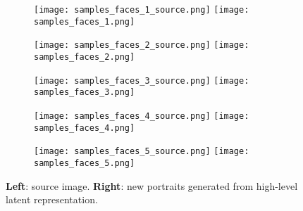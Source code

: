 \documentclass{article}
\begin{document}
\begin{figure*}[p]

\begin{subfigure}{0.98\textwidth}
  \centering
  \texttt{[image: samples\_faces\_1\_source.png]}
  \hspace{14pt}
  \texttt{[image: samples\_faces\_1.png]}

\end{subfigure}

\vspace{3pt}

 \begin{subfigure}{0.98\textwidth}
   \centering
   \texttt{[image: samples\_faces\_2\_source.png]}
  \hspace{14pt}
   \texttt{[image: samples\_faces\_2.png]}

 \end{subfigure}

 \vspace{3pt}

 \begin{subfigure}{0.98\textwidth}
   \centering
   \texttt{[image: samples\_faces\_3\_source.png]}
  \hspace{14pt}
   \texttt{[image: samples\_faces\_3.png]}

 \end{subfigure}

 \vspace{3pt}

\begin{subfigure}{0.98\textwidth}
  \centering
  \texttt{[image: samples\_faces\_4\_source.png]}
  \hspace{14pt}
  \texttt{[image: samples\_faces\_4.png]}

\end{subfigure}

\vspace{3pt}

\begin{subfigure}{0.98\textwidth}
  \centering
  \texttt{[image: samples\_faces\_5\_source.png]}
  \hspace{14pt}
  \texttt{[image: samples\_faces\_5.png]}

\end{subfigure}

\vspace{3pt}

\caption{\textbf{Left}: source image. \textbf{Right}: new portraits generated from high-level latent representation.}
\label{fig:faces}


\end{figure*}
\end{document}
